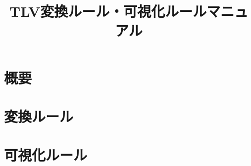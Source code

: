 \documentclass[a4paper,12pt]{jreport}
\begin{document}
\title{TLV変換ルール・可視化ルールマニュアル}
\maketitle
\pagestyle{plain} 
\setcounter{page}{1}
\tableofcontents

\pagestyle{plain} 
\setcounter{page}{1}
\chapter{概要}


\chapter{変換ルール}


\chapter{可視化ルール}


%


\end{document}
